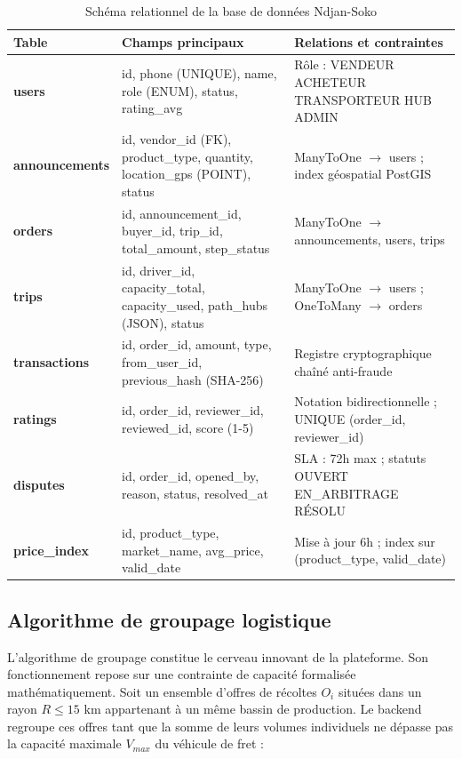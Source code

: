 \documentclass[12pt,a4paper]{report}
\begin{document}
\begin{table}[H]
\centering
\caption{Schéma relationnel de la base de données Ndjan-Soko}
\begin{tabularx}{\textwidth}{L{2.8cm} L{5cm} X}
\toprule
\textbf{Table} & \textbf{Champs principaux} & \textbf{Relations et contraintes} \\
\midrule
\textbf{users} & id, phone (UNIQUE), name, role (ENUM), status, rating\_avg & Rôle : VENDEUR \textbar{} ACHETEUR \textbar{} TRANSPORTEUR \textbar{} HUB \textbar{} ADMIN \\
\textbf{announcements} & id, vendor\_id (FK), product\_type, quantity, location\_gps (POINT), status & ManyToOne $\to$ users ; index géospatial PostGIS \\
\textbf{orders} & id, announcement\_id, buyer\_id, trip\_id, total\_amount, step\_status & ManyToOne $\to$ announcements, users, trips \\
\textbf{trips} & id, driver\_id, capacity\_total, capacity\_used, path\_hubs (JSON), status & ManyToOne $\to$ users ; OneToMany $\to$ orders \\
\textbf{transactions} & id, order\_id, amount, type, from\_user\_id, previous\_hash (SHA-256) & Registre cryptographique chaîné anti-fraude \\
\textbf{ratings} & id, order\_id, reviewer\_id, reviewed\_id, score (1-5) & Notation bidirectionnelle ; UNIQUE (order\_id, reviewer\_id) \\
\textbf{disputes} & id, order\_id, opened\_by, reason, status, resolved\_at & SLA : 72h max ; statuts OUVERT \textbar{} EN\_ARBITRAGE \textbar{} RÉSOLU \\
\textbf{price\_index} & id, product\_type, market\_name, avg\_price, valid\_date & Mise à jour 6h ; index sur (product\_type, valid\_date) \\
\bottomrule
\end{tabularx}
\end{table}

\subsection{Algorithme de groupage logistique}

L'algorithme de groupage constitue le cerveau innovant de la plateforme. Son fonctionnement repose sur une contrainte de capacité formalisée mathématiquement. Soit un ensemble d'offres de récoltes $O_i$ situées dans un rayon $R \leq 15$ km appartenant à un même bassin de production. Le backend regroupe ces offres tant que la somme de leurs volumes individuels ne dépasse pas la capacité maximale $V_{max}$ du véhicule de fret :
\end{document}
